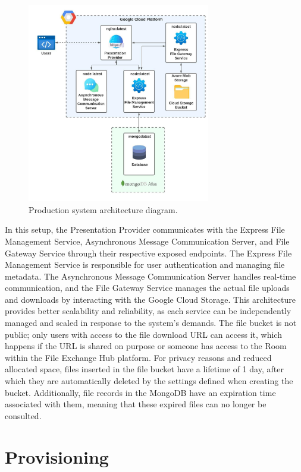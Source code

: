 \documentclass[a4paper,fleqn]{cas-dc}
\begin{document}
\begin{figure}[h]
\centering
\includegraphics[width=8cm]{architectureProd.jpeg}
\caption{Production system architecture diagram.}
\label{fig:architectureProd}
\end{figure}

In this setup, the Presentation Provider communicates with the Express File Management Service, Asynchronous Message Communication Server, and File Gateway Service through their respective exposed endpoints. The Express File Management Service is responsible for user authentication and managing file metadata. The Asynchronous Message Communication Server handles real-time communication, and the File Gateway Service manages the actual file uploads and downloads by interacting with the Google Cloud Storage. This architecture provides better scalability and reliability, as each service can be independently managed and scaled in response to the system's demands. The file bucket is not public; only users with access to the file download URL can access it, which happens if the URL is shared on purpose or someone has access to the Room within the File Exchange Hub platform. For privacy reasons and reduced allocated space, files inserted in the file bucket have a lifetime of 1 day, after which they are automatically deleted by the settings defined when creating the bucket. Additionally, file records in the MongoDB have an expiration time associated with them, meaning that these expired files can no longer be consulted.

\section{Provisioning} \label{sec:provisioning}
\end{document}
